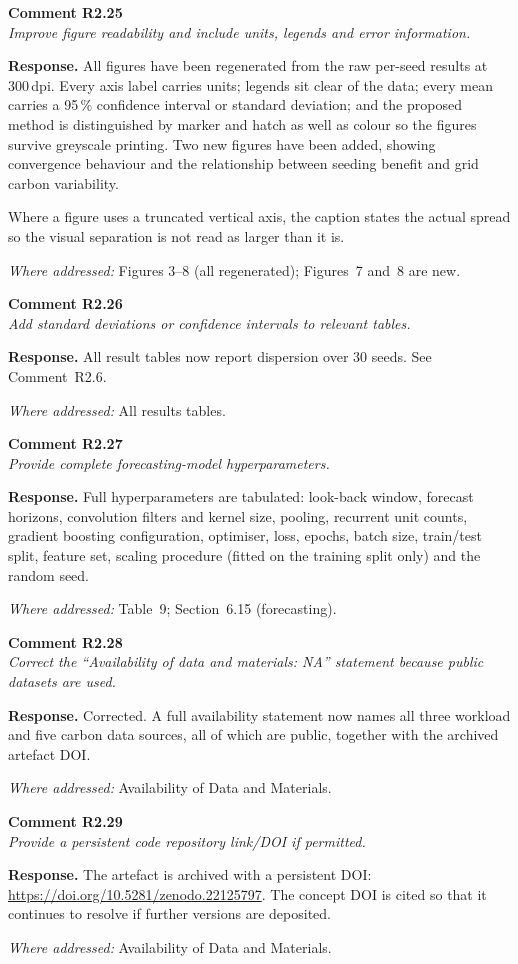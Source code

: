 \documentclass[11pt,a4paper]{article}
\newcommand{\rsp}[1]{\vspace{2pt}\noindent\textbf{Response.} #1\par\vspace{6pt}}
\newcommand{\rwhere}[1]{\noindent\textit{Where addressed:} #1\par\vspace{10pt}}
\newenvironment{revcomment}[1]
  {\begin{tcolorbox}[colback=gray!6,colframe=gray!45,boxrule=0.4pt,
     left=6pt,right=6pt,top=4pt,bottom=4pt]\textbf{#1}\\[2pt]\itshape\color{cmt}}
  {\end{tcolorbox}\vspace{4pt}}
\begin{document}
\begin{revcomment}{Comment R2.25}
Improve figure readability and include units, legends and error information.
\end{revcomment}
\rsp{All figures have been regenerated from the raw per-seed results at 300\,dpi.
Every axis label carries units; legends sit clear of the data; every mean carries a
95\,\% confidence interval or standard deviation; and the proposed method is
distinguished by marker and hatch as well as colour so the figures survive
greyscale printing. Two new figures have been added, showing convergence behaviour
and the relationship between seeding benefit and grid carbon variability.

Where a figure uses a truncated vertical axis, the caption states the actual spread
so the visual separation is not read as larger than it is.}
\rwhere{Figures 3--8 (all regenerated); Figures~7 and~8 are new.}

\begin{revcomment}{Comment R2.26}
Add standard deviations or confidence intervals to relevant tables.
\end{revcomment}
\rsp{All result tables now report dispersion over 30 seeds. See Comment~R2.6.}
\rwhere{All results tables.}

\begin{revcomment}{Comment R2.27}
Provide complete forecasting-model hyperparameters.
\end{revcomment}
\rsp{Full hyperparameters are tabulated: look-back window, forecast horizons,
convolution filters and kernel size, pooling, recurrent unit counts, gradient
boosting configuration, optimiser, loss, epochs, batch size, train/test split,
feature set, scaling procedure (fitted on the training split only) and the random
seed.}
\rwhere{Table~9; Section~6.15 (forecasting).}

\begin{revcomment}{Comment R2.28}
Correct the ``Availability of data and materials: NA'' statement because public
datasets are used.
\end{revcomment}
\rsp{Corrected. A full availability statement now names all three workload and five
carbon data sources, all of which are public, together with the archived artefact
DOI.}
\rwhere{Availability of Data and Materials.}

\begin{revcomment}{Comment R2.29}
Provide a persistent code repository link/DOI if permitted.
\end{revcomment}
\rsp{The artefact is archived with a persistent DOI:
\url{https://doi.org/10.5281/zenodo.22125797}. The concept DOI is cited so that it
continues to resolve if further versions are deposited.}
\rwhere{Availability of Data and Materials.}
\end{document}
